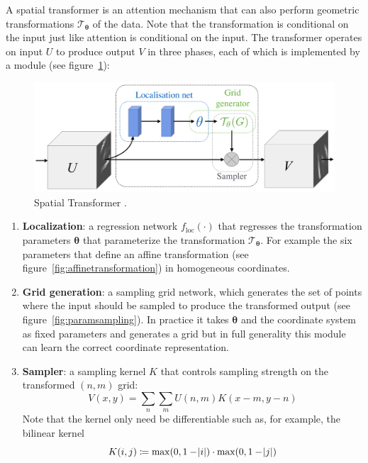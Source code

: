 A spatial transformer \cite{jaderberg2015spatial} is an attention mechanism that can also perform geometric transformations \(\mathcal{T}_{\bm{\theta}}\) of the data.
%
Note that the transformation is conditional on the input just like attention is conditional on the input.
%
The transformer operates on input \(U\) to produce output \(V\) in three phases, each of which is implemented by a module (see figure~\ref{fig:spacetransformer}): 
\begin{figure}[!htbp]
    \centering
    \includegraphics[width=.49\textwidth]{figures/neural_networks/space_transformer.png}
    \caption{Spatial Transformer \cite{jaderberg2015spatial}.}\label{fig:spacetransformer}
\end{figure}
\begin{mdframed}
    \begin{enumerate}
        \item \textbf{Localization}: a regression network \(f_{\text{loc}}(\cdot)\) that regresses the transformation parameters \(\bm{\theta}\) that parameterize the transformation \(\mathcal{T}_{\bm{\theta}}\). For example the six parameters that define an affine transformation (see figure~\ref{fig:affinetransformation}) in homogeneous coordinates.
        \item \textbf{Grid generation}: a sampling grid network, which generates the set of points where the input should be sampled to produce the transformed output (see figure~\ref{fig:paramsampling}). In practice it takes \(\bm{\theta}\) and the coordinate system as fixed parameters and generates a grid but in full generality this module can learn the correct coordinate representation.
        \item \textbf{Sampler}: a sampling kernel \(K\) that controls sampling strength on the transformed \((n,m)\) grid:
        \begin{equation*}
            V(x,y) = \sum_n \sum_m U(n,m) K(x-m, y-n)
        \end{equation*}
        Note that the kernel only need  be differentiable such as, for example, the bilinear kernel \begin{equation*}
            K(i, j) \coloneqq \max(0, 1-\abs{i})\cdot \max(0, 1- \abs{j})
        \end{equation*}
    \end{enumerate}
\end{mdframed}
